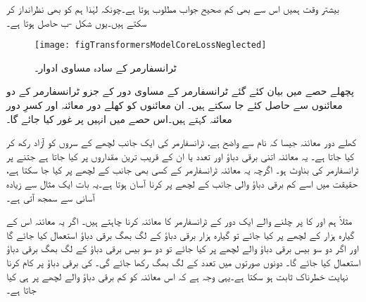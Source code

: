 بیشتر وقت ہمیں اس سے بھی کم صحیح جواب مطلوب ہوتا ہے۔چونکہ   لہٰذا ہم   کو بھی نظرانداز کر سکتے ہیں۔یوں شکل -ب حاصل ہوتا ہے۔
\begin{figure}
\centering
\texttt{[image: figTransformersModelCoreLossNeglected]}
\caption{ٹرانسفارمر کے سادہ مساوی ادوار۔}
\label{شکل_ٹرانسفارمر_سادہ_ماڈل}
\end{figure}
پچھلے حصے میں بیان کئے گئے ٹرانسفارمر کے مساوی دور کے جزو ٹرانسفارمر کے دو معائنوں سے حاصل کئے جا سکتے ہیں۔ ان معائنوں کو کھلے دور معائنہ اور کسرِ دور معائنہ کہتے ہیں۔اس حصے میں انہیں پر غور کیا جائے گا۔

کھلے  دور معائنہ جیسا کہ نام سے واضح  ہے،  ٹرانسفارمر کی ایک جانب لچھے کے سروں کو آزاد رکھ کر کیا جاتا ہے۔ یہ معائنہ اتنی برقی دباؤ اور تعدد یا ان کے قریب ترین مقداروں پر کیا جاتا ہے جتنے پر ٹرانسفارمر کی بناوٹ ہو۔ اگرچہ یہ معائنہ ٹرانسفارمر کے کسی بھی جانب کے لچھے پر کیا جا سکتا ہے، حقیقت میں اسے کم برقی دباؤ والی جانب کے لچھے پر کرنا آسان ہوتا ہے۔یہ بات ایک مثال سے زیادہ آسانی سے سمجھ آتی ہے۔

	مثلاً  ہم   اور   کا  پر چلنے والے ایک دور کے ٹرانسفارمر کا معائنہ کرنا چاہتے ہیں۔ اگر یہ معائنہ اس کے گیارہ ہزار کے لچھے پر  کیا جائے تو گیارہ ہزار برقی دباؤ کے لگ بھگ برقی دباؤ استعمال کیا جائے گا اور اگر دو سو بیس برقی دباؤ والے لچھے پر کیا جائے تو دو سو بیس برقی دباؤ کے لگ بھگ برقی دباؤ  استعمال کیا جائے گا۔ دونوں صورتوں میں تعدد  کے لگ بھگ رکھا جائے گی۔ کی برقی دباؤ پر کام کرنا نہایت خطرناک ثابت ہو سکتا ہے۔یہی وجہ ہے کہ اس معائنہ کو کم برقی دباؤ والے لچھے پر ہی کیا جاتا ہے۔

